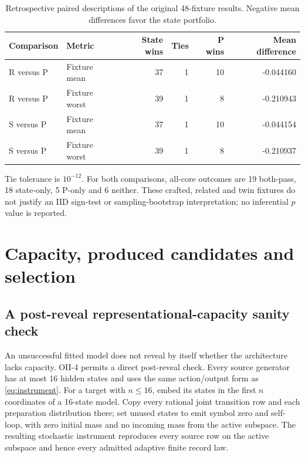 \begin{table}[tbp]
\centering\caption{Retrospective paired descriptions of the original 48-fixture results. Negative mean differences favor the state portfolio.}\label{tab:paired-fixture}
\small\begin{tabular}{@{}llrrrr@{}}\toprule
Comparison & Metric & State wins & Ties & P wins & Mean difference\\\midrule
R versus P & Fixture mean & 37 & 1 & 10 & -0.044160\\
R versus P & Fixture worst & 39 & 1 & 8 & -0.210943\\
S versus P & Fixture mean & 37 & 1 & 10 & -0.044154\\
S versus P & Fixture worst & 39 & 1 & 8 & -0.210937\\\bottomrule
\end{tabular}
\par\smallskip\footnotesize Tie tolerance is $10^{-12}$. For both comparisons, all-core outcomes are 19 both-pass, 18 state-only, 5 P-only and 6 neither. These crafted, related and twin fixtures do not justify an IID sign-test or sampling-bootstrap interpretation; no inferential $p$ value is reported.
\end{table}





\section{Capacity, produced candidates and selection}\label{sec:capacity}
\subsection{A post-reveal representational-capacity sanity check}\label{p3:c12}
An unsuccessful fitted model does not reveal by itself whether the architecture lacks capacity. OII-4 permits a direct post-reveal check. Every source generator has at most 16 hidden states and uses the same action/output form as \cref{eq:instrument}. For a target with $n\leq16$, embed its states in the first $n$ coordinates of a 16-state model. Copy every rational joint transition row and each preparation distribution there; set unused states to emit symbol zero and self-loop, with zero initial mass and no incoming mass from the active subspace. The resulting stochastic instrument reproduces every source row on the active subspace and hence every admitted adaptive finite record law.

